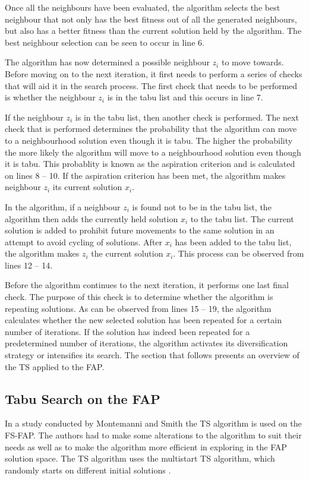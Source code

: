 Once all the neighbours have been evaluated, the algorithm selects the best neighbour that not only has the best fitness out of all the generated neighbours, but also has a better fitness than the current solution held by the algorithm. The best neighbour selection can be seen to occur in line 6.

The algorithm has now determined a possible neighbour $z_i$ to move towards. Before moving on to the next iteration, it first needs to perform a series of checks that will aid it in the search process. The first check that needs to be performed is whether the neighbour $z_i$ is in the tabu list and this occurs in line 7. 

If the neighbour $z_i$ is in the tabu list, then another check is performed. The next check that is performed determines the probability that the algorithm can move to a neighbourhood solution even though it is tabu. The higher the probability the more likely the algorithm will move to a neighbourhood solution even though it is tabu. This probablity is known as the aspiration criterion and is calculated on lines 8 -- 10. If the aspiration criterion has been met, the algorithm makes neighbour $z_i$ its current solution $x_i$.

In the algorithm, if a neighbour $z_i$ is found not to be in the tabu list, the algorithm then adds the currently held solution $x_i$ to the tabu list. The current solution is added to prohibit future movements to the same solution in an attempt to avoid cycling of solutions. After $x_i$ has been added to the tabu list, the algorithm makes $z_i$ the current solution $x_i$. This process can be observed from lines 12 -- 14.

Before the algorithm continues to the next iteration, it performs one last final check. The purpose of this check is to determine whether the algorithm is repeating solutions. As can be observed from lines 15 -- 19, the algorithm calculates whether the new selected solution has been repeated for a certain number of iterations. If the solution has indeed been repeated for a predetermined number of iterations, the algorithm activates its diversification strategy or intensifies its search.
The section that follows presents an overview of the \gls{TS} applied to the \gls{FAP}.
\subsection{Tabu Search on the \gls{FAP}}
In a study conducted by Montemanni and Smith \cite{TabuMontemanniSmith} the \gls{TS} algorithm is used on the \gls{FS-FAP}. The authors had to make some alterations to the algorithm to suit their needs as well as to make the algorithm more efficient in exploring in the \gls{FAP} solution space. The \gls{TS} algorithm uses the multistart \gls{TS} algorithm, which randomly starts on different initial solutions \cite{TabuMontemanniSmith}.

